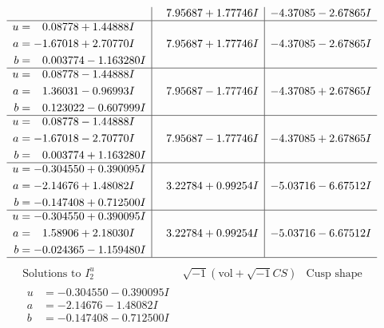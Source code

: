 \documentclass[1p]{elsarticle_modified}
\theoremstyle{definition}
\newcommand{\I}{\sqrt{-1}}
\begin{document}
$$\begin{array}{c|c|c}
 & \phantom{-}7.95687 + 1.77746 I & -4.37085 - 2.67865 I \\ \hline\begin{aligned}
u &= \phantom{-}0.08778 + 1.44888 I \\
a &= -1.67018 + 2.70770 I \\
b &= \phantom{-}0.003774 - 1.163280 I\end{aligned}
 & \phantom{-}7.95687 + 1.77746 I & -4.37085 - 2.67865 I \\ \hline\begin{aligned}
u &= \phantom{-}0.08778 - 1.44888 I \\
a &= \phantom{-}1.36031 - 0.96993 I \\
b &= \phantom{-}0.123022 - 0.607999 I\end{aligned}
 & \phantom{-}7.95687 - 1.77746 I & -4.37085 + 2.67865 I \\ \hline\begin{aligned}
u &= \phantom{-}0.08778 - 1.44888 I \\
a &= -1.67018 - 2.70770 I \\
b &= \phantom{-}0.003774 + 1.163280 I\end{aligned}
 & \phantom{-}7.95687 - 1.77746 I & -4.37085 + 2.67865 I \\ \hline\begin{aligned}
u &= -0.304550 + 0.390095 I \\
a &= -2.14676 + 1.48082 I \\
b &= -0.147408 + 0.712500 I\end{aligned}
 & \phantom{-}3.22784 + 0.99254 I & -5.03716 - 6.67512 I \\ \hline\begin{aligned}
u &= -0.304550 + 0.390095 I \\
a &= \phantom{-}1.58906 + 2.18030 I \\
b &= -0.024365 - 1.159480 I\end{aligned}
 & \phantom{-}3.22784 + 0.99254 I & -5.03716 - 6.67512 I\\
 \hline 
 \end{array}$$\newpage$$\begin{array}{c|c|c}  
\text{Solutions to }I^u_{2}& \I (\text{vol} + \sqrt{-1}CS) & \text{Cusp shape}\\
 \hline 
\begin{aligned}
u &= -0.304550 - 0.390095 I \\
a &= -2.14676 - 1.48082 I \\
b &= -0.147408 - 0.712500 I\end{aligned}

\end{array}$$
\end{document}
